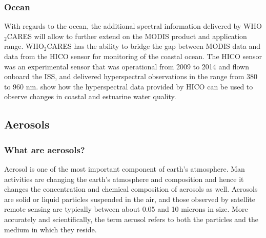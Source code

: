 \documentclass{scrartcl}
\newcommand{\whocares}{WHO$_2$CARES }
\begin{document}
\subsubsection{Ocean}
\label{sec:orgde76ad3}

With regards to the ocean, the additional spectral information delivered by \whocares
will allow to further extend on the MODIS product and application range. \whocares has
the ability to bridge the gap between MODIS data and data from the HICO sensor for
monitoring of the coastal ocean. The HICO sensor was an experimental sensor that was
operational from 2009 to 2014 and flown onboard the ISS, and delivered hyperspectral
observations in the range from 380 to  960 nm. \citet{keith} show how the hyperspectral
data provided by HICO can be used to observe changes in coastal and estuarine water quality.


\subsection{Aerosols}
\label{sec:org850e761}
\subsubsection{What are aerosols?}
Aerosol is one of the most important component of earth’s atmosphere. Man activities are changing the earth’s atmosphere and composition and hence it changes the concentration and chemical composition of aerosols as well. Aerosols are solid or liquid particles suspended in the air, and those observed by satellite remote sensing are typically between about 0.05 and 10 microns in size. More accurately and scientifically, the term aerosol refers to both the particles and the medium in which they reside.  
\end{document}
